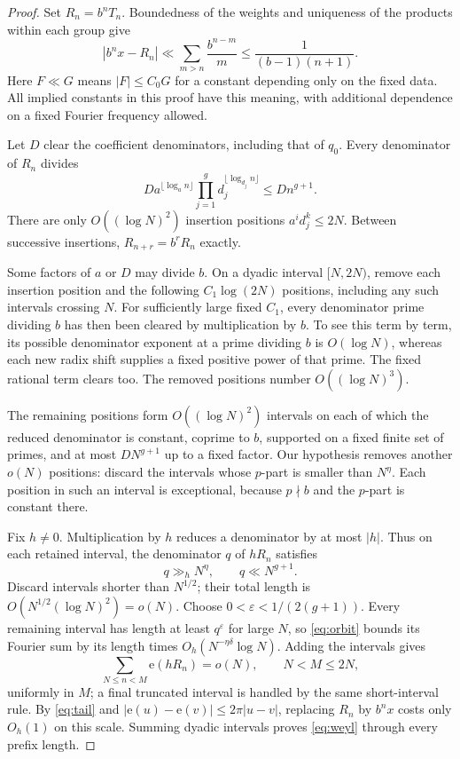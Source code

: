 \documentclass[11pt]{article}
\newcommand{\e}{\mathrm e}
\begin{document}
\begin{proof}
Set \(R_n=b^nT_n\). Boundedness of the weights and uniqueness of the
products within each group give
\begin{equation}\label{eq:tail}
 |b^n x-R_n|
 \ll \sum_{m>n}\frac{b^{n-m}}m
 \le\frac1{(b-1)(n+1)}.
\end{equation}
Here \(F\ll G\) means \(|F|\le C_0G\) for a constant depending only
on the fixed data. All implied constants in this proof have this
meaning, with additional dependence on a fixed Fourier frequency allowed.

Let \(D\) clear the coefficient denominators, including that of \(q_0\).
Every denominator of \(R_n\) divides
\begin{equation}\label{eq:den-upper}
 D a^{\lfloor\log_a n\rfloor}
       \prod_{j=1}^g d_j^{\lfloor\log_{d_j}n\rfloor}
 \le D n^{g+1}.
\end{equation}
There are only \(O((\log N)^2)\) insertion positions
\(a^i d_j^k\le2N\). Between successive insertions,
\(R_{n+r}=b^rR_n\) exactly.

Some factors of \(a\) or \(D\) may divide \(b\). On a dyadic
interval \([N,2N)\), remove each insertion position and the following
\(C_1\log(2N)\) positions, including any such intervals crossing \(N\).
For sufficiently large fixed \(C_1\), every denominator prime dividing
\(b\) has then been cleared by multiplication by \(b\). To see this
term by term, its possible denominator exponent at a prime dividing
\(b\) is \(O(\log N)\), whereas each new radix shift supplies a
fixed positive power of that prime. The fixed rational term clears too.
The removed positions number \(O((\log N)^3)\).

The remaining positions form \(O((\log N)^2)\) intervals on each of
which the reduced denominator is constant, coprime to \(b\), supported
on a fixed finite set of primes, and at most \(DN^{g+1}\) up to a
fixed factor. Our hypothesis removes another \(o(N)\) positions:
discard the intervals whose \(p\)-part is smaller than \(N^\eta\).
Each position in such an interval is exceptional, because \(p\nmid b\)
and the \(p\)-part is constant there.

Fix \(h\ne0\). Multiplication by \(h\) reduces a denominator by at
most \(|h|\). Thus on each retained interval, the denominator \(q\)
of \(hR_n\) satisfies
\[
 q\gg_h N^\eta,\qquad q\ll N^{g+1}.
\]
Discard intervals shorter than \(N^{1/2}\); their total length is
\(O(N^{1/2}(\log N)^2)=o(N)\). Choose
\(0<\varepsilon<1/(2(g+1))\). Every remaining interval has length
at least \(q^\varepsilon\) for large \(N\), so \eqref{eq:orbit}
bounds its Fourier sum by its length times \(O_h(N^{-\eta\delta}\log N)\).
Adding the intervals gives
\[
 \sum_{N\le n<M}\e(hR_n)=o(N),\qquad N<M\le2N,
\]
uniformly in \(M\); a final truncated interval is handled by the same
short-interval rule. By \eqref{eq:tail} and
\(|\e(u)-\e(v)|\le2\pi|u-v|\), replacing \(R_n\) by \(b^nx\)
costs only \(O_h(1)\) on this scale. Summing dyadic intervals proves
\eqref{eq:weyl} through every prefix length.
\end{proof}
\end{document}
